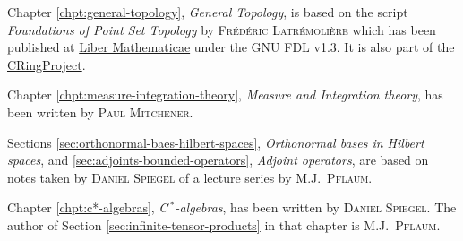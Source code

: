  Chapter \ref{chpt:general-topology}, \textit{General Topology}, is based on 
 the script \textit{Foundations of Point Set Topology}  
 by \textsc{Fr\'ed\'eric Latr\'emoli\`ere} which has been published 
 at \href{http://www.libermath.org}{\textsf{Liber Mathematicae}} under the GNU FDL v1.3. 
 It is also part of the 
 \href{http://www.libermath.org/CRingProject}{CRingProject}.

 Chapter \ref{chpt:measure-integration-theory},
 \textit{Measure and Integration theory},
 has been written by \textsc{Paul Mitchener}.
 
 Sections \ref{sec:orthonormal-baes-hilbert-spaces}, \textit{Orthonormal bases in Hilbert spaces}, and \ref{sec:adjoints-bounded-operators}, \textit{Adjoint operators}, are based on notes 
 taken by \textsc{Daniel Spiegel} of a lecture series by \textsc{M.J.~Pflaum}.
 
 Chapter \ref{chpt:c*-algebras}, \textit{C\,$^*$-algebras}, has been written
 by \textsc{Daniel Spiegel}. The author of
 Section \ref{sec:infinite-tensor-products} in that chapter is  \textsc{M.J.~Pflaum}.
 